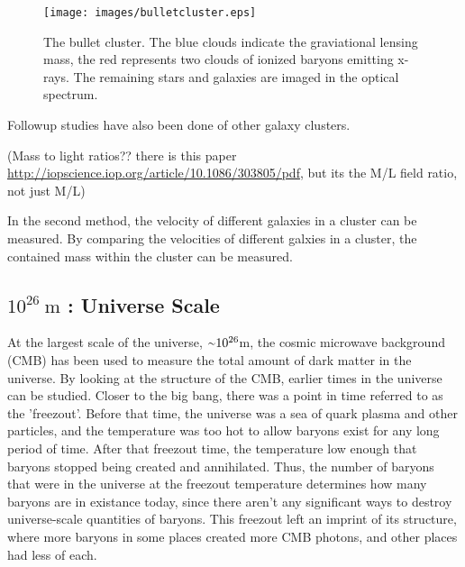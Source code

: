     \begin{figure}[ht]
      \texttt{[image: images/bulletcluster.eps]}
      \caption[The Bullet Cluster]{
        The bullet cluster\cite{bullet_cluster_combined_image}.
        The blue clouds indicate the graviational lensing mass\cite{bullet_cluster}, the red represents two clouds of ionized baryons emitting x-rays\cite{bullet_cluster_chandramap}.
        The remaining stars and galaxies are imaged in the optical spectrum\cite{bullet_cluster_composite}.}
      \label{fig:bullet}
    \end{figure}

    Followup studies have also been done of other galaxy clusters.

    {\color{red}(Mass to light ratios?? there is this paper \url{http://iopscience.iop.org/article/10.1086/303805/pdf}, but its the M/L field ratio, not just M/L)}

    In the second method, the velocity of different galaxies in a cluster can be measured.
    By comparing the velocities of different galxies in a cluster, the contained mass within the cluster can be measured.

  \subsection{$10^{26}\:\text{m}$ : Universe Scale}
    At the largest scale of the universe, $\nicetilde 10^{26}$m, the cosmic microwave background (CMB) has been used to measure the total amount of dark matter in the universe.
    By looking at the structure of the CMB, earlier times in the universe can be studied.
    Closer to the big bang, there was a point in time referred to as the 'freezout'.
    Before that time, the universe was a sea of quark plasma and other particles, and the temperature was too hot to allow baryons exist for any long period of time.
    After that freezout time, the temperature low enough that baryons stopped being created and annihilated.
    Thus, the number of baryons that were in the universe at the freezout temperature determines how many baryons are in existance today, since there aren't any significant ways to destroy universe-scale quantities of baryons.
    This freezout left an imprint of its structure, where more baryons in some places created more CMB photons, and other places had less of each.

